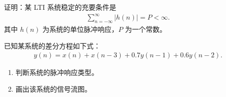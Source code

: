 \begin{exercise}
    \label{exercise:LTI-stable}
    证明：某 LTI 系统稳定的充要条件是
    \begin{align*}
        \sum_{n = -\infty}^{\infty} |h(n)| = P < \infty.
    \end{align*}
    其中 $h(n)$ 为系统的单位脉冲响应，$P$ 为一个常数。
\end{exercise}

\begin{homework}
    已知某系统的差分方程如下式：
    \begin{align*}
        y(n) = x(n) + x(n - 3) + 0.7y(n - 1) + 0.6y(n - 2).
    \end{align*}
    \begin{enumerate}[label=(\arabic*)]
        \item 判断系统的脉冲响应类型。
        \item 画出该系统的信号流图。
    \end{enumerate}
\end{homework}

